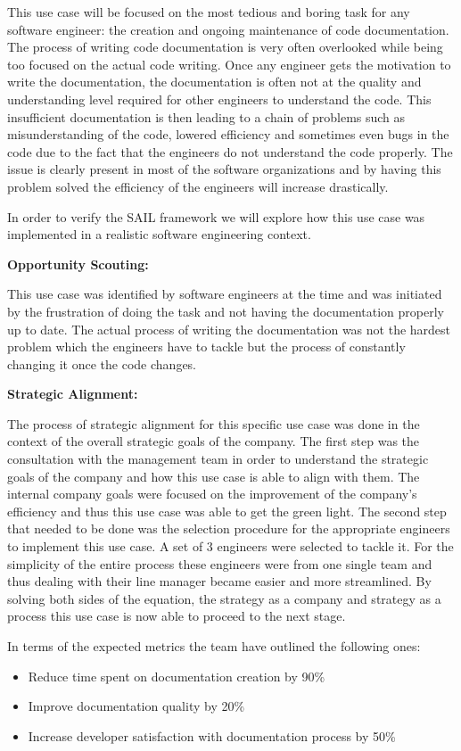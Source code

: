 \documentclass[]{imc-inf}
\def\tightlist{}
\begin{document}
This use case will be focused on the most tedious and boring task for any software engineer: the creation and ongoing maintenance of code documentation. The process of writing code documentation is very often overlooked while being too focused on the actual code writing. Once any engineer gets the motivation to write the documentation, the documentation is often not at the quality and understanding level required for other engineers to understand the code. This insufficient documentation is then leading to a chain of problems such as misunderstanding of the code, lowered efficiency and sometimes even bugs in the code due to the fact that the engineers do not understand the code properly. The issue is clearly present in most of the software organizations and by having this problem solved the efficiency of the engineers will increase drastically.

In order to verify the SAIL framework we will explore how this use case was implemented in a realistic software engineering context.

\textbf{Opportunity Scouting:} 

This use case was identified by software engineers at the time and was initiated by the frustration of doing the task and not having the documentation properly up to date. The actual process of writing the documentation was not the hardest problem which the engineers have to tackle but the process of constantly changing it once the code changes.


\textbf{Strategic Alignment:} 

The process of strategic alignment for this specific use case was done in the context of the overall strategic goals of the company. The first step was the consultation with the management team in order to understand the strategic goals of the company and how this use case is able to align with them. The internal company goals were focused on the improvement of the company's efficiency and thus this use case was able to get the green light. The second step that needed to be done was the selection procedure for the appropriate engineers to implement this use case. A set of 3 engineers were selected to tackle it. For the simplicity of the entire process these engineers were from one single team and thus dealing with their line manager became easier and more streamlined. By solving both sides of the equation, the strategy as a company and strategy as a process this use case is now able to proceed to the next stage.

In terms of the expected metrics the team have outlined the following ones:
\begin{itemize}
	\tightlist
	\item
	Reduce time spent on documentation creation by 90\%
	\item
	Improve documentation quality by 20\%
	\item
	Increase developer satisfaction with documentation process by 50\%
\end{itemize}
\end{document}
